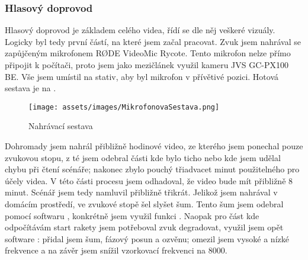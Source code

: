 \subsubsection{Hlasový doprovod}
{Hlasový doprovod je základem celého videa, řídí se dle něj veškeré vizuály. Logicky byl tedy první částí, na které jsem začal pracovat.}\odst
{Zvuk jsem nahrával se zapůjčeným mikrofonem RØDE VideoMic Rycote. Tento mikrofon nelze přímo připojit k počítači, proto jsem jako mezičlánek využil kameru JVS GC-PX100 BE. Vše jsem umístil na stativ, aby byl mikrofon v přívětivé pozici. Hotová sestava je na .}

\begin{figure}[H]
    \centering
    \texttt{[image: assets/images/MikrofonovaSestava.png]}
    \caption{Nahrávací sestava \jaFoto}
    \label{obr:nahravaciSestava}
\end{figure}

{Dohromady jsem nahrál přibližně hodinové video, ze kterého jsem ponechal pouze zvukovou stopu, z té jsem odebral části kde bylo ticho nebo kde jsem udělal chybu při čtení scénáře; nakonec zbylo pouchý třiadvacet minut použitelného pro účely videa. V této části procesu jsem odhadoval, že video bude mít přibližně 8 minut. Scénář jsem tedy namluvil přibližně třikrát.}\odst
{Jelikož jsem nahrával v domácím prostředí, ve zvukové stopě šel slyšet šum. Tento šum jsem odebral pomocí softwaru , konkrétně jsem využil funkci .}\odst
{Naopak pro část kde odpočítávám start rakety jsem potřeboval zvuk degradovat, využil jsem opět software : přidal jsem šum, fázový posun a ozvěnu; omezil jsem vysoké a nízké frekvence a na závěr jsem snížil vzorkovací frekvenci na 8000.}

\newpage

